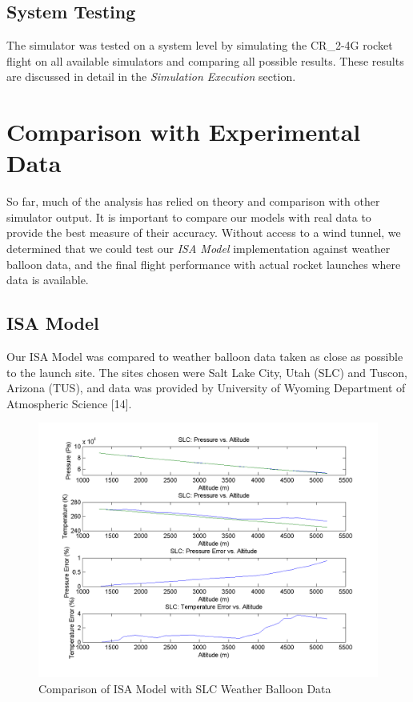 \documentclass[]{article}
\begin{document}
\subsection{System Testing}\label{system-testing}

The simulator was tested on a system level by simulating the CR\_2-4G
rocket flight on all available simulators and comparing all possible
results. These results are discussed in detail in the \emph{Simulation
Execution} section.

\section{Comparison with Experimental
Data}\label{comparison-with-experimental-data}

So far, much of the analysis has relied on theory and comparison with
other simulator output. It is important to compare our models with real
data to provide the best measure of their accuracy. Without access to a
wind tunnel, we determined that we could test our \emph{ISA Model}
implementation against weather balloon data, and the final flight
performance with actual rocket launches where data is available.

\subsection{ISA Model}\label{isa-model}

Our ISA Model was compared to weather balloon data taken as close as
possible to the launch site. The sites chosen were Salt Lake City, Utah
(SLC) and Tuscon, Arizona (TUS), and data was provided by University of
Wyoming Department of Atmospheric Science {[}14{]}.

\begin{figure}[htbp]
\centering
\includegraphics{images/plots/SLC_plot.png}
\caption{Comparison of ISA Model with SLC Weather Balloon Data
\label{atmosphere1_plot_label}}
\end{figure}
\end{document}
